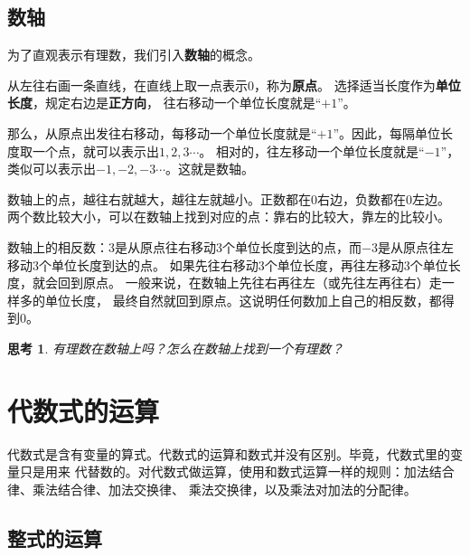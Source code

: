 \documentclass[12pt,UTF8]{ctexbook}
\newtheorem{sk}{思考}[section]
\begin{document}
\section{数轴}
为了直观表示有理数，我们引入\textbf{数轴}的概念。

从左往右画一条直线，在直线上取一点表示$0$，称为\textbf{原点}。
选择适当长度作为\textbf{单位长度}，规定右边是\textbf{正方向}，
往右移动一个单位长度就是“$+1$”。

那么，从原点出发往右移动，每移动一个单位长度就是“$+1$”。因此，每隔单位长度取一个点，就可以表示出$1,2,3\cdots$。
相对的，往左移动一个单位长度就是“$-1$”，类似可以表示出$-1,-2,-3\cdots$。这就是数轴。

数轴上的点，越往右就越大，越往左就越小。正数都在$0$右边，负数都在$0$左边。
两个数比较大小，可以在数轴上找到对应的点：靠右的比较大，靠左的比较小。

数轴上的相反数：$3$是从原点往右移动$3$个单位长度到达的点，而$-3$是从原点往左移动$3$个单位长度到达的点。
如果先往右移动$3$个单位长度，再往左移动$3$个单位长度，就会回到原点。
一般来说，在数轴上先往右再往左（或先往左再往右）走一样多的单位长度，
最终自然就回到原点。这说明任何数加上自己的相反数，都得到$0$。

\begin{sk}\label{sk:3-2-0}
    有理数在数轴上吗？怎么在数轴上找到一个有理数？
\end{sk}

\chapter{代数式的运算}
代数式是含有变量的算式。代数式的运算和数式并没有区别。毕竟，代数式里的变量只是用来
代替数的。对代数式做运算，使用和数式运算一样的规则：加法结合律、乘法结合律、加法交换律、
乘法交换律，以及乘法对加法的分配律。

\section{整式的运算}
\end{document}
